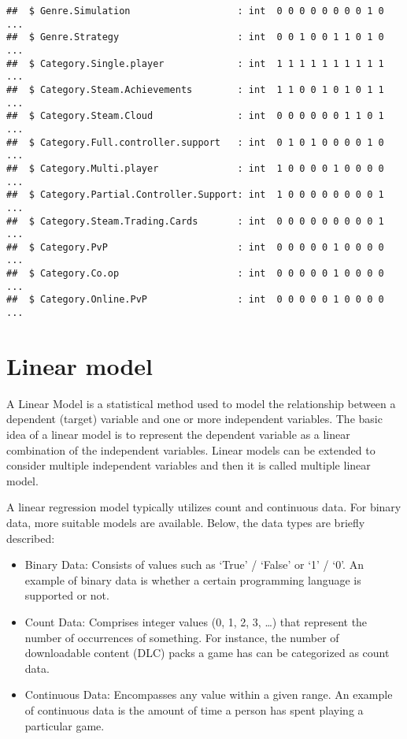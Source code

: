 \documentclass[
]{article}
\providecommand{\tightlist}{%
  \setlength{\itemsep}{0pt}\setlength{\parskip}{0pt}}
\begin{document}
\begin{verbatim}
##  $ Genre.Simulation                   : int  0 0 0 0 0 0 0 0 1 0 ...
##  $ Genre.Strategy                     : int  0 0 1 0 0 1 1 0 1 0 ...
##  $ Category.Single.player             : int  1 1 1 1 1 1 1 1 1 1 ...
##  $ Category.Steam.Achievements        : int  1 1 0 0 1 0 1 0 1 1 ...
##  $ Category.Steam.Cloud               : int  0 0 0 0 0 0 1 1 0 1 ...
##  $ Category.Full.controller.support   : int  0 1 0 1 0 0 0 0 1 0 ...
##  $ Category.Multi.player              : int  1 0 0 0 0 1 0 0 0 0 ...
##  $ Category.Partial.Controller.Support: int  1 0 0 0 0 0 0 0 0 1 ...
##  $ Category.Steam.Trading.Cards       : int  0 0 0 0 0 0 0 0 0 1 ...
##  $ Category.PvP                       : int  0 0 0 0 0 1 0 0 0 0 ...
##  $ Category.Co.op                     : int  0 0 0 0 0 1 0 0 0 0 ...
##  $ Category.Online.PvP                : int  0 0 0 0 0 1 0 0 0 0 ...
\end{verbatim}

\hypertarget{linear-model}{%
\section{Linear model}\label{linear-model}}

A Linear Model is a statistical method used to model the relationship
between a dependent (target) variable and one or more independent
variables. The basic idea of a linear model is to represent the
dependent variable as a linear combination of the independent variables.
Linear models can be extended to consider multiple independent variables
and then it is called multiple linear model.

A linear regression model typically utilizes count and continuous data.
For binary data, more suitable models are available. Below, the data
types are briefly described:

\begin{itemize}
\tightlist
\item
  Binary Data: Consists of values such as `True' / `False' or `1' / `0'.
  An example of binary data is whether a certain programming language is
  supported or not.
\item
  Count Data: Comprises integer values (0, 1, 2, 3, \ldots) that
  represent the number of occurrences of something. For instance, the
  number of downloadable content (DLC) packs a game has can be
  categorized as count data.
\item
  Continuous Data: Encompasses any value within a given range. An
  example of continuous data is the amount of time a person has spent
  playing a particular game.
\end{itemize}
\end{document}
